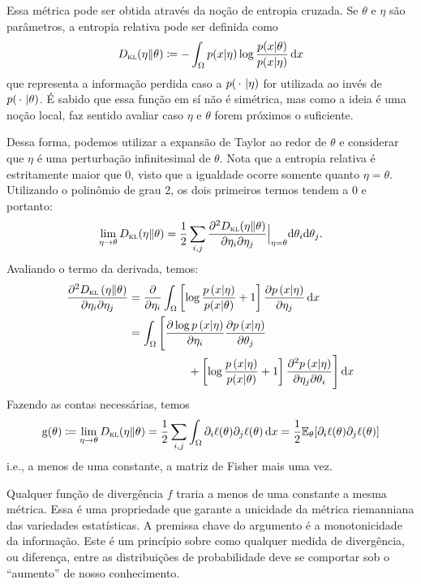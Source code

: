 Essa métrica pode ser obtida através da noção de entropia cruzada. Se $\theta$ e $\eta$ são parâmetros, a entropia relativa pode ser definida como
\begin{equation*}
	D_{\textsc{kl}}(\eta \| \theta) \coloneqq - \int_{\Omega} p(x|\eta) \log \dfrac{p(x|\theta)}{p(x|\eta)}\,{\operatorname{d}}{x}
\end{equation*}
que representa a informação perdida caso a $p(\operatorname{\,\cdot\,}|\eta)$ for utilizada ao invés de $p(\operatorname{\,\cdot\,}|\theta)$. É sabido que essa função em sí não é simétrica, mas como a ideia é uma noção local, faz sentido avaliar caso $\eta$ e $\theta$ forem próximos o suficiente.

Dessa forma, podemos utilizar a expansão de Taylor ao redor de $\theta$ e considerar que $\eta$ é uma perturbação infinitesimal de $\theta$. Nota que a entropia relativa é estritamente maior que 0, visto que a igualdade ocorre somente quanto $\eta=\theta$. Utilizando o polinômio de grau 2, os dois primeiros termos tendem a $0$ e portanto:
\begin{equation*}
	\lim_{\eta \to \theta} D_{\textsc{kl}}(\eta\|\theta) = \dfrac12 \sum_{i,j}\dfrac{\partial^2D_{\textsc{kl}}(\eta\|\theta)}{\partial \eta_i\partial \eta_j} \Big|_{\eta = \theta} {\operatorname{d}}{\theta}_i{\operatorname{d}}{\theta}_j.
\end{equation*}
Avaliando o termo da derivada, temos:
$$
\begin{aligned}
\frac{\partial^2 D_{\textsc{kl}}\left(\eta\| \theta\right)}{\partial \eta_i \partial \eta_j} & =\frac{\partial}{\partial \eta_i} \int_\Omega \left[\log \frac{p\left(x|\eta\right)}{p(x|\theta)}+1\right] \frac{\partial p\left(x|\eta\right)}{\partial \eta_j} \,\de x \\
& =\int_{\Omega}\Bigg[\frac{\partial \log p\left(x|\eta\right)}{\partial \eta_i} \frac{\partial p\left(x|\eta\right)}{\partial \theta_j}\\
& \hphantom{=\int_{\Omega}\Bigg[\frac{\partial \log}{\partial \eta_i}}+\left[\log \frac{p\left(x|\eta\right)}{p(x|\theta)}+1\right] \frac{\partial^2 p\left(x|\eta\right)}{\partial \eta_j \partial \theta_i}\Bigg]\,\de x
\end{aligned}
$$
Fazendo as contas necessárias, temos 
$$
\mathrm g(\theta) \coloneqq \lim_{\eta \to \theta} D_{\textsc{kl}}(\eta\|\theta) = \dfrac12\sum_{i,j} \int_\Omega \partial_i\ell(\theta)\partial_j\ell(\theta)\,{\operatorname{d}}{x} = \dfrac12 \mathbb E_\theta[\partial_i\ell(\theta)\partial_j\ell(\theta)]
$$
i.e., a menos de uma constante, a matriz de Fisher mais uma vez.

\begin{observacao}
Qualquer função de divergência $f$ traria a menos de uma constante a mesma métrica. Essa é uma propriedade que garante a unicidade da métrica riemanniana das variedades estatísticas. A premissa chave do argumento é a monotonicidade da informação. Este é um princípio sobre como qualquer medida de divergência, ou diferença, entre as distribuições de probabilidade deve se comportar sob o ``aumento'' de nosso conhecimento.
\end{observacao}